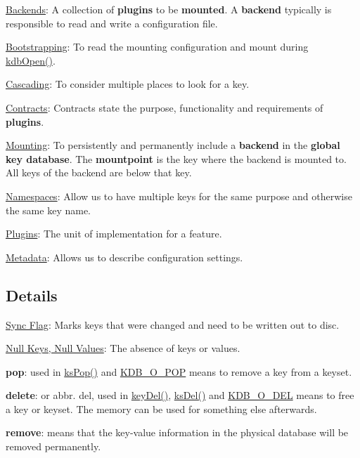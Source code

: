 \begin{DoxyItemize}
\item \hyperlink{doc_help_elektra-backends_md}{Backends}\+: A collection of {\bfseries plugins} to be {\bfseries mounted}. A {\bfseries backend} typically is responsible to read and write a configuration file.
\item \hyperlink{doc_help_elektra-bootstrapping_md}{Bootstrapping}\+: To read the mounting configuration and mount during {\ttfamily \hyperlink{group__kdb_ga6808defe5870f328dd17910aacbdc6ca}{kdb\+Open()}}.
\item \hyperlink{doc_help_elektra-cascading_md}{Cascading}\+: To consider multiple places to look for a key.
\item \hyperlink{doc_help_elektra-contracts_md}{Contracts}\+: Contracts state the purpose, functionality and requirements of {\bfseries plugins}.
\item \hyperlink{doc_help_elektra-mounting_md}{Mounting}\+: To persistently and permanently include a {\bfseries backend} in the {\bfseries global key database}. The {\bfseries mountpoint} is the key where the backend is mounted to. All keys of the backend are below that key.
\item \hyperlink{doc_help_elektra-namespaces_md}{Namespaces}\+: Allow us to have multiple keys for the same purpose and otherwise the same key name.
\item \hyperlink{src_plugins_README_md}{Plugins}\+: The unit of implementation for a feature.
\item \hyperlink{doc_help_elektra-metadata_md}{Metadata}\+: Allows us to describe configuration settings.
\end{DoxyItemize}

\subsection*{Details}


\begin{DoxyItemize}
\item \hyperlink{doc_help_elektra-sync-flag_md}{Sync Flag}\+: Marks keys that were changed and need to be written out to disc.
\item \hyperlink{doc_help_elektra-values_md}{Null Keys, Null Values}\+: The absence of keys or values.
\item {\bfseries pop}\+: used in {\ttfamily \hyperlink{group__keyset_gae42530b04defb772059de0600159cf69}{ks\+Pop()}} and \hyperlink{group__keyset_gga98a3d6a4016c9dad9cbd1a99a9c2a45aa52fb5f2cc86773d393da62bebebf7984}{K\+D\+B\+\_\+\+O\+\_\+\+P\+OP} means to remove a key from a keyset.
\item {\bfseries delete}\+: or abbr. del, used in {\ttfamily \hyperlink{group__key_ga3df95bbc2494e3e6703ece5639be5bb1}{key\+Del()}}, {\ttfamily \hyperlink{group__keyset_ga27e5c16473b02a422238c8d970db7ac8}{ks\+Del()}} and \hyperlink{group__keyset_gga98a3d6a4016c9dad9cbd1a99a9c2a45aa66a5380c120f25f28f49848c4a863ead}{K\+D\+B\+\_\+\+O\+\_\+\+D\+EL} means to free a key or keyset. The memory can be used for something else afterwards.
\item {\bfseries remove}\+: means that the key-\/value information in the physical database will be removed permanently. 
\end{DoxyItemize}